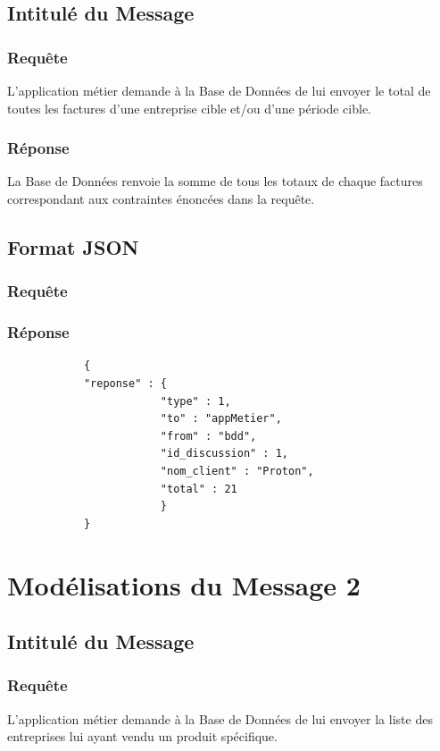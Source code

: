 \documentclass[a4paper, 11pt]{article}
\begin{document}
    \subsection{Intitulé du Message}
        \subsubsection{Requête} 
        L'application métier demande à la Base de Données de lui envoyer le total de toutes les factures d'une entreprise cible et/ou d'une période cible.
        \subsubsection{Réponse}
        La Base de Données renvoie la somme de tous les totaux de chaque factures correspondant aux contraintes énoncées dans la requête.
    \subsection{Format JSON}
        \subsubsection{Requête}
        
        \subsubsection{Réponse}
        \begin{verbatim}
            {
            "reponse" : {
                        "type" : 1,
                        "to" : "appMetier",
                        "from" : "bdd",
                        "id_discussion" : 1,
                        "nom_client" : "Proton",
                        "total" : 21
                        }
            }
        \end{verbatim}
\section{Modélisations du Message 2}
    \subsection{Intitulé du Message}
        \subsubsection{Requête} 
        L'application métier demande à la Base de Données de lui envoyer la liste des entreprises lui ayant vendu un produit spécifique.
\end{document}
